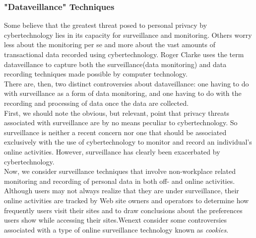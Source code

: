 \documentclass[12pt]{article}
\theoremstyle{definition}
\begin{document}
\subsubsection{"Dataveillance" Techniques}
Some believe that the greatest threat posed to personal privacy by cybertechnology lies in its capacity for surveillance and monitoring. Others worry less about the monitoring per se and more about the vast amounts of transactional data recorded using cybertechnology. Roger Clarke uses the term dataveillance to capture both the surveillance(data monitoring) and data recording techniques made possible by computer technology.\\
There are, then, two distinct controversies about dataveillance: one having to do with surveillance as a form of data monitoring, and one having to do with the recording and processing of data once the data are collected.\\
First, we should note the obvious, but relevant, point that privacy threats associated with surveillance are by no means peculiar to cybertechnology. So surveillance is neither a recent concern nor one that should be associated exclusively with the use of cybertechnology to monitor and record an individual’s online activities. However, surveillance has clearly been exacerbated by cybertechnology.\\
Now, we consider surveillance techniques that involve non-workplace related monitoring and recording of personal data in both off- and online activities. Although users may not always realize that they are under surveillance, their online activities are tracked by Web site owners and operators to determine how frequently users visit their sites and to draw conclusions about the preferences users show while accessing their sites.Wenext consider some controversies associated with a type of online surveillance technology known as \textit{cookies}.
\end{document}
